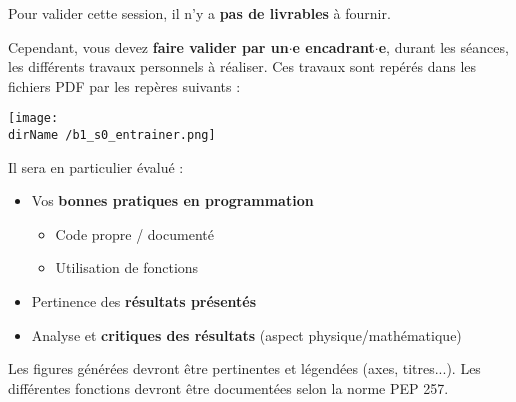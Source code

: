 
Pour valider cette session, il n'y a \textbf{pas de livrables} à fournir.

Cependant, vous devez \textbf{faire valider par un$\cdot$e encadrant$\cdot$e}, durant les séances, les différents travaux personnels à réaliser. Ces travaux sont repérés dans les fichiers PDF par les repères suivants : 

\begin{center}
\texttt{[image: \\dirName /b1\_s0\_entrainer.png]}
\end{center}

\medskip

Il sera en particulier évalué : 

\begin{itemize}
	\item Vos \textbf{bonnes pratiques en programmation}
	\begin{itemize}
		\item Code propre / documenté
		\item Utilisation de fonctions
	\end{itemize}
	\item Pertinence des \textbf{résultats présentés}
	\item Analyse et \textbf{critiques des résultats} (aspect physique/mathématique)
	
\end{itemize}

\medskip

Les figures générées devront être pertinentes et légendées (axes, titres...). Les différentes fonctions devront être documentées selon la norme PEP 257.